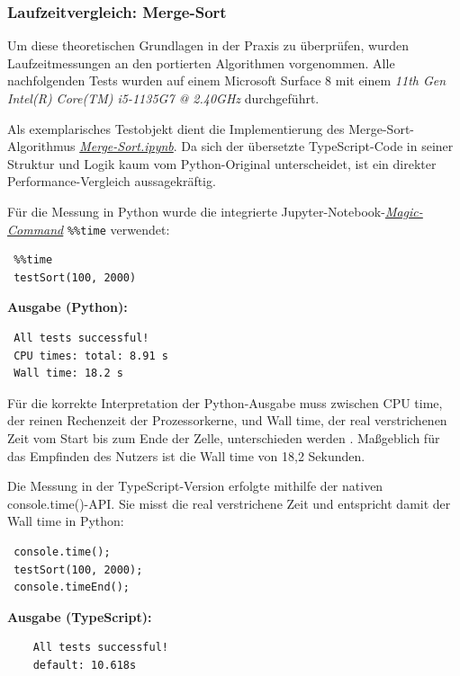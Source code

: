 \subsubsection{Laufzeitvergleich: Merge-Sort}
Um diese theoretischen Grundlagen in der Praxis zu überprüfen, wurden Laufzeitmessungen an den portierten Algorithmen vorgenommen. Alle nachfolgenden Tests wurden auf einem Microsoft Surface 8 mit einem \textit{11th Gen Intel(R) Core(TM) i5-1135G7 @ 2.40GHz} durchgeführt.

Als exemplarisches Testobjekt dient die Implementierung des Merge-Sort-Algorithmus \href{https://github.com/zLeoll/TS-Translation-for-TheoInf/blob/main/Algorithms/Chapter-06/Merge-Sort.ipynb}{\textit{Merge-Sort.ipynb}}. Da sich der übersetzte TypeScript-Code in seiner Struktur und Logik kaum vom Python-Original unterscheidet, ist ein direkter Performance-Vergleich aussagekräftig.

Für die Messung in Python wurde die integrierte Jupyter-Notebook-\href{https://ipython.readthedocs.io/en/stable/interactive/magics.html}{\textit{Magic-Command}} \texttt{\%\%time} verwendet:
\begin{verbatim}
 %%time
 testSort(100, 2000)
\end{verbatim}
\caption{Time-Funktion in Python}

\textbf{Ausgabe (Python):}
\begin{verbatim}
 All tests successful!
 CPU times: total: 8.91 s
 Wall time: 18.2 s
\end{verbatim}

Für die korrekte Interpretation der Python-Ausgabe muss zwischen CPU time, der reinen Rechenzeit der Prozessorkerne, und Wall time, der real verstrichenen Zeit vom Start bis zum Ende der Zelle, unterschieden werden \cite{jupyter-walltime}. Maßgeblich für das Empfinden des Nutzers ist die Wall time von 18,2 Sekunden.

Die Messung in der TypeScript-Version erfolgte mithilfe der nativen console.time()-API. Sie misst die real verstrichene Zeit und entspricht damit der Wall time in Python:
\begin{verbatim}
 console.time();
 testSort(100, 2000);
 console.timeEnd();
\end{verbatim}

\textbf{Ausgabe (TypeScript):}
\begin{verbatim}
	All tests successful!
	default: 10.618s
\end{verbatim}

